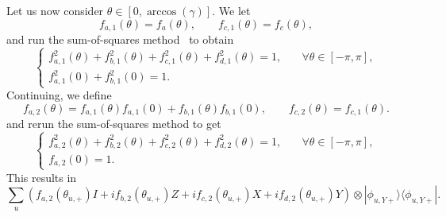 \documentclass[letterpaper,onecolumn,11pt,accepted=2026-02-14]{quantumarticle}
\theoremstyle{remark}
\theoremstyle{plain}
\newcommand{\ket}[1]{|#1\rangle}
\newcommand{\bra}[1]{\langle#1|}
\newcommand{\ketbra}[2]{\ket{#1}\!\bra{#2}}
\begin{document}
Let us now consider $\theta\in\left[0,\arccos\left(\gamma\right)\right]$. We let
\begin{equation}
    f_{a,1}(\theta)=f_a(\theta),\qquad
    f_{c,1}(\theta)=f_c(\theta),
\end{equation}
and run the sum-of-squares method~\cite{MethodologyLYC} to obtain
\begin{equation}
\begin{cases}
    f_{a,1}^2(\theta)+f_{b,1}^2(\theta)+f_{c,1}^2(\theta)+f_{d,1}^2(\theta)=1,\quad &\forall \theta\in[-\pi,\pi],\\
    f_{a,1}^2(0)+f_{b,1}^2(0)=1.
\end{cases}
\end{equation}
Continuing, we define
\begin{equation}
    f_{a,2}(\theta)=f_{a,1}(\theta)f_{a,1}(0)+f_{b,1}(\theta)f_{b,1}(0),\qquad
    f_{c,2}(\theta)=f_{c,1}(\theta).
\end{equation}
and rerun the sum-of-squares method to get
\begin{equation}
\begin{cases}
    f_{a,2}^2(\theta)+f_{b,2}^2(\theta)+f_{c,2}^2(\theta)+f_{d,2}^2(\theta)=1,\quad &\forall \theta\in[-\pi,\pi],\\
    f_{a,2}(0)=1.
\end{cases}
\end{equation}
This results in
\begin{equation}
    \sum_u \left(f_{a,2}(\theta_{u,+})I+if_{b,2}(\theta_{u,+})Z+if_{c,2}(\theta_{u,+})X+if_{d,2}(\theta_{u,+})Y\right)\otimes\ketbra{\phi_{u,Y+}}{\phi_{u,Y+}}.
\end{equation}
\end{document}

